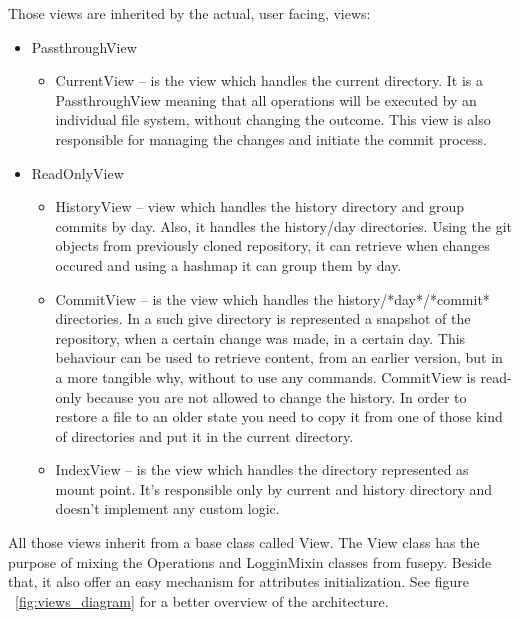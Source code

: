 Those views are inherited by the actual, user facing, views:
\begin{itemize}
    \item PassthroughView
    \begin{itemize}
        \item CurrentView – is the view which handles the current directory. It is a PassthroughView meaning that all operations will be executed by an individual file system, without changing the outcome. This view is also responsible for managing the changes and initiate the commit process.
    \end{itemize}
    
    \item ReadOnlyView
    \begin{itemize}
        \item HistoryView – view which handles the history directory and group commits by day. Also, it handles the history/{day} directories. Using the git objects from previously cloned repository, it can retrieve when changes occured and using a hashmap it can group them by day.
        \item CommitView – is the view which handles the history/*day*/*commit* directories. In a such give directory is represented a snapshot of the repository, when a certain change was made, in a certain day. This behaviour can be used to retrieve content, from an earlier version, but in a more tangible why, without to use any commands. CommitView is read-only because you are not allowed to change the history. In order to restore a file to an older state you need to copy it from one of those kind of directories and put it in the current directory.
        \item IndexView – is the view which handles the directory represented as mount point. It's responsible only by current and history directory and doesn't implement any custom logic.
    \end{itemize}
\end{itemize}

All those views inherit from a base class called View. The View class has the purpose of mixing the Operations and LogginMixin classes from fusepy. Beside that, it also offer an easy mechanism for attributes initialization. See figure ~\ref{fig:views_diagram} for a better overview of the architecture.


